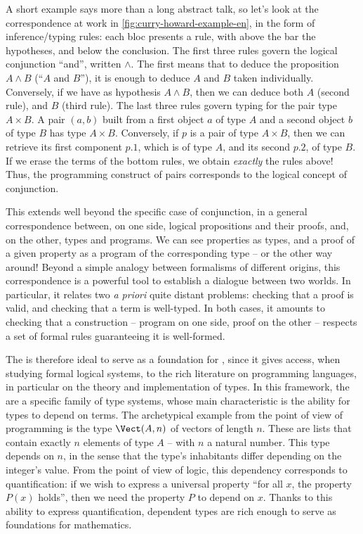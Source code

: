 A short example says more than a long abstract talk, so let’s look at the correspondence
at work in \cref{fig:curry-howard-example-en}, in the form of inference/typing rules:
each bloc presents a rule, with above the bar the hypotheses, and below the conclusion.
The first three rules govern the logical conjunction “and”, written $\wedge$.
The first means that to deduce the proposition $A \wedge B$ (“$A$ and $B$”), it is enough
to deduce $A$ and $B$ taken individually.
Conversely, if we have as hypothesis $A \wedge B$, then we can deduce both $A$ (second rule),
and $B$ (third rule).
The last three rules govern typing%
for the pair type $A \times B$. A pair $(a,b)$ built
from a first object $a$ of type $A$ and a second object $b$ of type $B$ has type $A \times B$.
Conversely, if $p$ is a pair of type $A \times B$, then we can retrieve its first component
$p.1$, which is of type $A$, and its second $p.2$, of type $B$.
If we erase the terms%
of the bottom rules, we obtain \emph{exactly} the rules above!
Thus, the programming construct of pairs corresponds to the logical concept of conjunction.

This extends well beyond the specific case of conjunction, in a general correspondence
between, on one side, logical propositions and their proofs, and, on the other, types and programs.
We can see properties as types, and a proof of a given property as a program of the
corresponding type – or the other way around!
Beyond a simple analogy between formalisms of different origins, this correspondence
is a powerful tool to establish a dialogue between two worlds. In particular, it
relates two \textit{a priori} quite distant problems: checking that a proof
is valid, and checking that a term is well-typed. In both cases, it amounts to checking that
a construction – program on one side, proof on the other – respects a set of formal
rules guaranteeing it is well-formed.

The  is therefore ideal to serve as a foundation for
, since it gives access, when studying formal logical systems,
to the rich literature on programming languages, in particular on the theory and
implementation of types. In this framework, the
 are a specific family of type systems,
whose main characteristic is the ability for types to depend on terms. The archetypical
example from the point of view of programming is the type $\Vect(A,n)$
of vectors of length $n$. These are lists that contain exactly $n$ elements of type $A$ – with
$n$ a natural number.
This type depends on $n$, in the sense that the type’s inhabitants differ depending on the
integer’s value.
From the point of view of logic, this dependency corresponds to quantification: if we
wish to express a universal property “for all $x$, the property $P(x)$ holds”, then we need
the property $P$ to depend on $x$.
Thanks to this ability to express quantification, dependent types are rich enough
to serve as foundations for mathematics.

